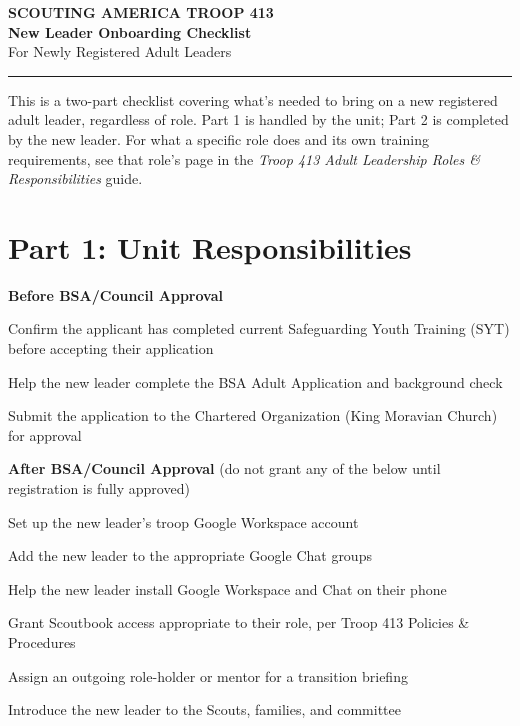 \documentclass[11pt, letterpaper]{article}
\begin{document}
\begin{center}
  {\small\color{scoutgreen}\textbf{SCOUTING AMERICA \textbullet{} TROOP 413}} \\[4pt]
  {\fontsize{20pt}{24pt}\selectfont\bfseries\color{scoutgreen} New Leader Onboarding Checklist} \\[4pt]
  {\large\color{accent} For Newly Registered Adult Leaders} \\[4pt]
  \textcolor{accent}{\rule{0.6\linewidth}{1pt}}
\end{center}

\vspace{0.3em}
\small

This is a two-part checklist covering what's needed to bring on a new registered adult leader, regardless of role. Part 1 is handled by the unit; Part 2 is completed by the new leader. For what a specific role does and its own training requirements, see that role's page in the \textit{Troop 413 Adult Leadership Roles \& Responsibilities} guide.

\section{Part 1: Unit Responsibilities}

\textbf{\color{scoutgreen} Before BSA/Council Approval}
\begin{checklist}
  \item Confirm the applicant has completed current Safeguarding Youth Training (SYT) before accepting their application
  \item Help the new leader complete the BSA Adult Application and background check
  \item Submit the application to the Chartered Organization (King Moravian Church) for approval
\end{checklist}

\textbf{\color{scoutgreen} After BSA/Council Approval} (do not grant any of the below until registration is fully approved)
\begin{checklist}
  \item Set up the new leader's troop Google Workspace account
  \item Add the new leader to the appropriate Google Chat groups
  \item Help the new leader install Google Workspace and Chat on their phone
  \item Grant Scoutbook access appropriate to their role, per Troop 413 Policies \& Procedures
  \item Assign an outgoing role-holder or mentor for a transition briefing
  \item Introduce the new leader to the Scouts, families, and committee
\end{checklist}
\end{document}
